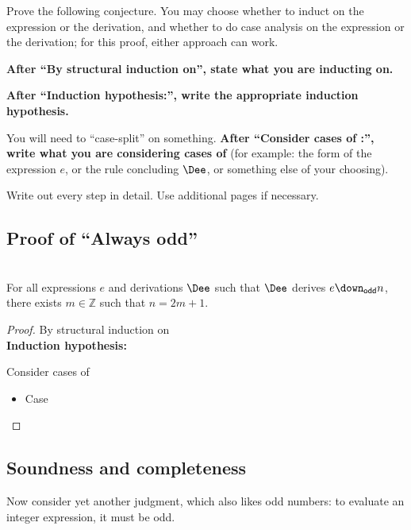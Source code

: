 Prove the following conjecture.  You may choose whether to induct on the expression
or the derivation, and whether to do case analysis on the expression or the derivation;
for this proof, either approach can work.

\textbf{After ``By structural induction on'', state what you are inducting on.}

\textbf{After ``Induction hypothesis:'', write the appropriate induction hypothesis.}

You will need to ``case-split'' on something.
\textbf{After ``Consider cases of :'', write what you are considering cases of}
(for example: the form of the expression $e$, or the rule concluding $\Dee$,
or something else of your choosing).

Write out every step in detail.  Use additional pages if necessary.

\subsection*{Proof of ``Always odd''}

\begin{conjecture} ~\\
  For all expressions $e$ and derivations $\Dee$ such that $\Dee$ derives $e \downodd n$,\\
  there exists $m \in \mathbb{Z}$ such that $n = 2m + 1$.
\end{conjecture}
\begin{proof}
  By structural induction on
  \vspace{1ex} 
  \\
  \textbf{Induction hypothesis: }
  \vspace{7ex}

  Consider cases of 

  \begin{itemize}
  \item Case
  \end{itemize}


    \vfill
\end{proof}

\clearpage

\subsection*{Soundness and completeness}

Now consider yet another judgment, which also likes odd numbers:
to evaluate an integer expression, it must be odd.

